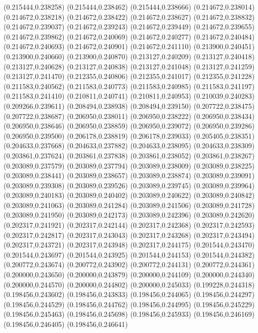 (0.215444,0.238258)
(0.215444,0.238462)
(0.215444,0.238666)
(0.214672,0.238014)
(0.214672,0.238218)
(0.214672,0.238422)
(0.214672,0.238627)
(0.214672,0.238832)
(0.214672,0.239037)
(0.214672,0.239243)
(0.214672,0.239449)
(0.214672,0.239655)
(0.214672,0.239862)
(0.214672,0.240069)
(0.214672,0.240277)
(0.214672,0.240484)
(0.214672,0.240693)
(0.214672,0.240901)
(0.214672,0.241110)
(0.213900,0.240451)
(0.213900,0.240660)
(0.213900,0.240870)
(0.213127,0.240209)
(0.213127,0.240418)
(0.213127,0.240628)
(0.213127,0.240838)
(0.213127,0.241048)
(0.213127,0.241259)
(0.213127,0.241470)
(0.212355,0.240806)
(0.212355,0.241017)
(0.212355,0.241228)
(0.211583,0.240562)
(0.211583,0.240773)
(0.211583,0.240985)
(0.211583,0.241197)
(0.211583,0.241410)
(0.210811,0.240741)
(0.210811,0.240953)
(0.210039,0.240283)
(0.209266,0.239611)
(0.208494,0.238938)
(0.208494,0.239150)
(0.207722,0.238475)
(0.207722,0.238687)
(0.206950,0.238011)
(0.206950,0.238222)
(0.206950,0.238434)
(0.206950,0.238646)
(0.206950,0.238859)
(0.206950,0.239072)
(0.206950,0.239286)
(0.206950,0.239500)
(0.206178,0.238819)
(0.206178,0.239033)
(0.205405,0.238351)
(0.204633,0.237668)
(0.204633,0.237882)
(0.204633,0.238095)
(0.204633,0.238309)
(0.203861,0.237624)
(0.203861,0.237838)
(0.203861,0.238052)
(0.203861,0.238267)
(0.203089,0.237579)
(0.203089,0.237794)
(0.203089,0.238009)
(0.203089,0.238225)
(0.203089,0.238441)
(0.203089,0.238657)
(0.203089,0.238874)
(0.203089,0.239091)
(0.203089,0.239308)
(0.203089,0.239526)
(0.203089,0.239745)
(0.203089,0.239964)
(0.203089,0.240183)
(0.203089,0.240402)
(0.203089,0.240622)
(0.203089,0.240842)
(0.203089,0.241063)
(0.203089,0.241284)
(0.203089,0.241506)
(0.203089,0.241728)
(0.203089,0.241950)
(0.203089,0.242173)
(0.203089,0.242396)
(0.203089,0.242620)
(0.202317,0.241921)
(0.202317,0.242144)
(0.202317,0.242368)
(0.202317,0.242593)
(0.202317,0.242817)
(0.202317,0.243043)
(0.202317,0.243268)
(0.202317,0.243494)
(0.202317,0.243721)
(0.202317,0.243948)
(0.202317,0.244175)
(0.201544,0.243470)
(0.201544,0.243697)
(0.201544,0.243925)
(0.201544,0.244153)
(0.201544,0.244382)
(0.200772,0.243674)
(0.200772,0.243902)
(0.200772,0.244131)
(0.200772,0.244361)
(0.200000,0.243650)
(0.200000,0.243879)
(0.200000,0.244109)
(0.200000,0.244340)
(0.200000,0.244570)
(0.200000,0.244802)
(0.200000,0.245033)
(0.199228,0.244318)
(0.198456,0.243602)
(0.198456,0.243833)
(0.198456,0.244065)
(0.198456,0.244297)
(0.198456,0.244529)
(0.198456,0.244762)
(0.198456,0.244995)
(0.198456,0.245229)
(0.198456,0.245463)
(0.198456,0.245698)
(0.198456,0.245933)
(0.198456,0.246169)
(0.198456,0.246405)
(0.198456,0.246641)
